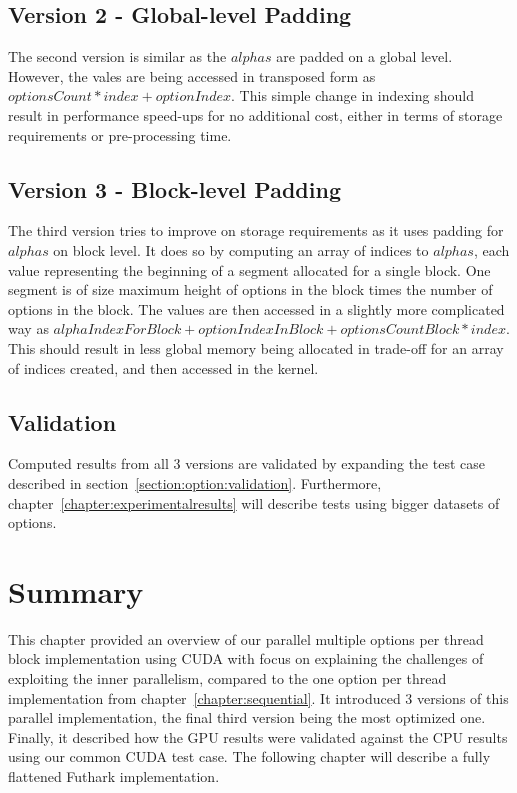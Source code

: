 \subsection*{Version 2 - Global-level Padding}
The second version is similar as the $\mathit{alphas}$ are padded on a global level. However, the vales are being accessed in transposed form as $\mathit{optionsCount} * \mathit{index} + \mathit{optionIndex}$. This simple change in indexing should result in performance speed-ups for no additional cost, either in terms of storage requirements or pre-processing time.

\subsection*{Version 3 - Block-level Padding}
The third version tries to improve on storage requirements as it uses padding for $\mathit{alphas}$ on block level. It does so by computing an array of indices to $\mathit{alphas}$, each value representing the beginning of a segment allocated for a single block. One segment is of size maximum height of options in the block times the number of options in the block. The values are then accessed in a slightly more complicated way as $\mathit{alphaIndexForBlock} + \mathit{optionIndexInBlock} + \mathit{optionsCountBlock} * \mathit{index}$. This should result in less global memory being allocated in trade-off for an array of indices created, and then accessed in the kernel.


\subsection*{Validation}
Computed results from all 3 versions are validated by expanding the test case described in section~\ref{section:option:validation}. Furthermore, chapter~\ref{chapter:experimentalresults} will describe tests using bigger datasets of options.

\section*{Summary}
This chapter provided an overview of our parallel multiple options per thread block implementation using CUDA with focus on explaining the challenges of exploiting the inner parallelism, compared to the one option per thread implementation from chapter~\ref{chapter:sequential}. It introduced 3 versions of this parallel implementation, the final third version being the most optimized one. Finally, it described how the GPU results were validated against the CPU results using our common CUDA test case. The following chapter will describe a fully flattened Futhark implementation.
